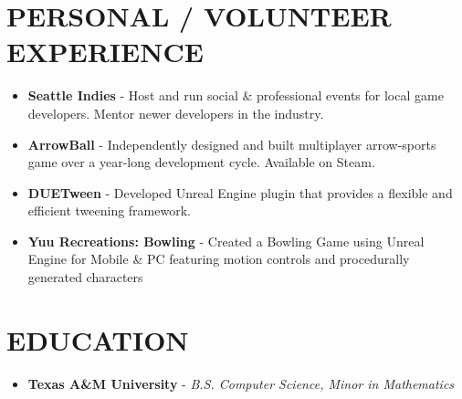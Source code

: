 \documentclass[resmargin,10pt]{res} %
\begin{document}
\begin{resume}
    \section{PERSONAL / VOLUNTEER EXPERIENCE}
    \begin{itemize}
        \setlength\itemsep{-0.0em}
        \item \textbf{Seattle Indies} - Host and run social \& professional events for local game developers. Mentor newer developers in the industry.
        \item \textbf{ArrowBall} - Independently designed and built multiplayer arrow-sports game over a year-long development cycle. Available on Steam.
        \item \textbf{DUETween} - Developed Unreal Engine plugin that provides a flexible and efficient tweening framework.
        \item \textbf{Yuu Recreations: Bowling} - Created a Bowling Game using Unreal Engine for Mobile \& PC featuring motion controls and procedurally generated characters
    \end{itemize}

    \section{EDUCATION}
    \begin{itemize}
        \setlength\itemsep{0.1em}
        \item[] {\bf Texas A\&M University} - \textit{B.S. Computer Science, Minor in Mathematics}
    \end{itemize}
\end{resume}
\end{document}
